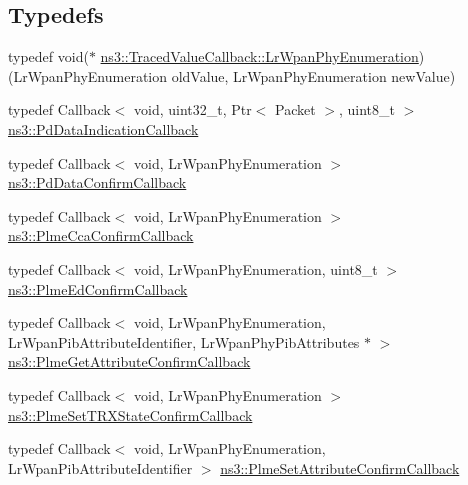 \subsection*{Typedefs}
\begin{DoxyCompactItemize}
\item 
typedef void($\ast$ \hyperlink{group__lr-wpan_ga83e29cd3a6a828f93f66faedbd978113}{ns3\+::\+Traced\+Value\+Callback\+::\+Lr\+Wpan\+Phy\+Enumeration}) (Lr\+Wpan\+Phy\+Enumeration old\+Value, Lr\+Wpan\+Phy\+Enumeration new\+Value)
\item 
typedef Callback$<$ void, uint32\+\_\+t, Ptr$<$ Packet $>$, uint8\+\_\+t $>$ \hyperlink{group__lr-wpan_ga5942bd2136b995f9104db9cfc311ace3}{ns3\+::\+Pd\+Data\+Indication\+Callback}
\item 
typedef Callback$<$ void, Lr\+Wpan\+Phy\+Enumeration $>$ \hyperlink{group__lr-wpan_ga0cba923353248fc2a8dc81303c6d5e35}{ns3\+::\+Pd\+Data\+Confirm\+Callback}
\item 
typedef Callback$<$ void, Lr\+Wpan\+Phy\+Enumeration $>$ \hyperlink{group__lr-wpan_gafd859f54b5982ab4c85838a40b1c7340}{ns3\+::\+Plme\+Cca\+Confirm\+Callback}
\item 
typedef Callback$<$ void, Lr\+Wpan\+Phy\+Enumeration, uint8\+\_\+t $>$ \hyperlink{group__lr-wpan_gadecf12d559c4db545036668cf9a384b6}{ns3\+::\+Plme\+Ed\+Confirm\+Callback}
\item 
typedef Callback$<$ void, Lr\+Wpan\+Phy\+Enumeration, Lr\+Wpan\+Pib\+Attribute\+Identifier, Lr\+Wpan\+Phy\+Pib\+Attributes $\ast$ $>$ \hyperlink{group__lr-wpan_ga024ef2b58b799155fc114f3d895ca283}{ns3\+::\+Plme\+Get\+Attribute\+Confirm\+Callback}
\item 
typedef Callback$<$ void, Lr\+Wpan\+Phy\+Enumeration $>$ \hyperlink{group__lr-wpan_ga65eacebda6dc7c1611bea032c5a525a7}{ns3\+::\+Plme\+Set\+T\+R\+X\+State\+Confirm\+Callback}
\item 
typedef Callback$<$ void, Lr\+Wpan\+Phy\+Enumeration, Lr\+Wpan\+Pib\+Attribute\+Identifier $>$ \hyperlink{group__lr-wpan_gab86861c72f1d605df34795c411122e68}{ns3\+::\+Plme\+Set\+Attribute\+Confirm\+Callback}
\end{DoxyCompactItemize}

